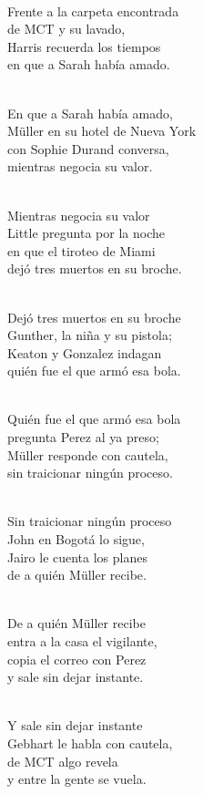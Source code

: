 \begin{lyrics}
\\
Frente a la carpeta encontrada\\
de MCT y su lavado,\\
Harris recuerda los tiempos\\
en que a Sarah había amado.

\\
En que a Sarah había amado,\\
Müller en su hotel de Nueva York\\
con Sophie Durand conversa,\\
mientras negocia su valor.

\\
Mientras negocia su valor\\
Little pregunta por la noche\\
en que el tiroteo de Miami\\
dejó tres muertos en su broche.

\\
Dejó tres muertos en su broche\\
Gunther, la niña y su pistola;\\
Keaton y Gonzalez indagan\\
quién fue el que armó esa bola.

\\
Quién fue el que armó esa bola\\
pregunta Perez al ya preso;\\
Müller responde con cautela,\\
sin traicionar ningún proceso.

\\
Sin traicionar ningún proceso\\
John en Bogotá lo sigue,\\
Jairo le cuenta los planes\\
de a quién Müller recibe.

\\
De a quién Müller recibe\\
entra a la casa el vigilante,\\
copia el correo con Perez\\
y sale sin dejar instante.

\\
Y sale sin dejar instante\\
Gebhart le habla con cautela,\\
de MCT algo revela\\
y entre la gente se vuela.


\end{lyrics}
